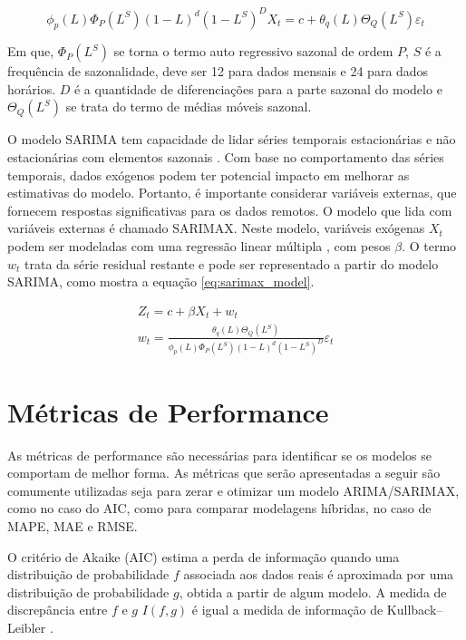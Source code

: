 \begin{equation}
\label{eq:sarima_model}
    \phi_p(L)\Phi_P(L^S)(1-L)^d(1-L^S)^D X_t = c + \theta_q(L)\Theta_Q(L^S)\varepsilon_t
\end{equation}

Em que, $\Phi_P(L^S)$ se torna o termo auto regressivo sazonal de ordem $P$, $S$ é a frequência de sazonalidade, deve ser 12 para dados mensais e 24 para dados horários. $D$ é a quantidade de diferenciações para a parte sazonal do modelo e $\Theta_Q(L^S)$ se trata do termo de médias móveis sazonal.

O modelo SARIMA tem capacidade de lidar séries temporais estacionárias e não estacionárias com elementos sazonais \cite{arunraj2016application}. Com base no comportamento das séries temporais, dados exógenos podem ter potencial impacto em melhorar as estimativas do modelo. Portanto, é importante considerar variáveis externas, que fornecem respostas significativas para os dados remotos. O modelo que lida com variáveis externas é chamado SARIMAX. Neste modelo, variáveis exógenas $X_t$ podem ser modeladas com uma regressão linear múltipla \cite{arunraj2016application,  elamin2018modeling}, com pesos $\beta$. O termo $w_t$ trata da série residual restante e pode ser representado a partir do modelo SARIMA, como mostra a equação \ref{eq:sarimax_model}.

\begin{equation}
\label{eq:sarimax_model}
    \begin{gathered}
        Z_t = c + \beta X_t +w_t\\
        w_t = \frac{\theta_q(L)\Theta_Q(L^S)}{ \phi_p(L)\Phi_P(L^S)(1-L)^d(1-L^S)^D}\varepsilon_t
    \end{gathered}
\end{equation}

\section{Métricas de Performance}

As métricas de performance são necessárias para identificar se os modelos se comportam de melhor forma. As métricas que serão apresentadas a seguir são comumente utilizadas seja para zerar e otimizar um modelo ARIMA/SARIMAX, como no caso do AIC, como para comparar modelagens híbridas, no caso de MAPE, MAE e RMSE.

O critério de Akaike (AIC) estima a perda de informação quando uma distribuição de probabilidade $f$ associada aos dados reais é aproximada por uma distribuição de probabilidade $g$, obtida a partir de algum modelo. A medida de discrepância entre $f$ e $g$ $I(f,g)$ é igual a medida de informação de Kullback–Leibler \cite{wagenmakers2004aic}.

